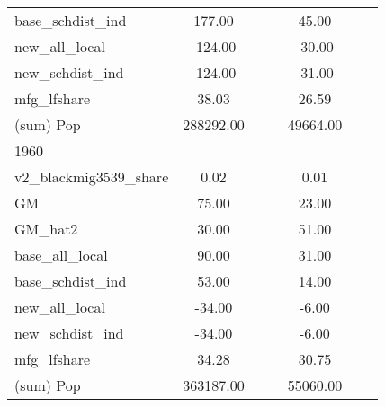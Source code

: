 \begin{table}[htbp]
\begin{tabular}{l*{2}{ccc}}
base\_schdist\_ind    &      177.00&            &            &       45.00&            &            \\
new\_all\_local       &     -124.00&            &            &      -30.00&            &            \\
new\_schdist\_ind     &     -124.00&            &            &      -31.00&            &            \\
mfg\_lfshare         &       38.03&            &            &       26.59&            &            \\
(sum) Pop           &   288292.00&            &            &    49664.00&            &            \\
\midrule
1960                &            &            &            &            &            &            \\
v2\_blackmig3539\_share&        0.02&            &            &        0.01&            &            \\
GM                  &       75.00&            &            &       23.00&            &            \\
GM\_hat2             &       30.00&            &            &       51.00&            &            \\
base\_all\_local      &       90.00&            &            &       31.00&            &            \\
base\_schdist\_ind    &       53.00&            &            &       14.00&            &            \\
new\_all\_local       &      -34.00&            &            &       -6.00&            &            \\
new\_schdist\_ind     &      -34.00&            &            &       -6.00&            &            \\
mfg\_lfshare         &       34.28&            &            &       30.75&            &            \\
(sum) Pop           &   363187.00&            &            &    55060.00&            &            \\
\bottomrule
\end{tabular}
\end{table}
